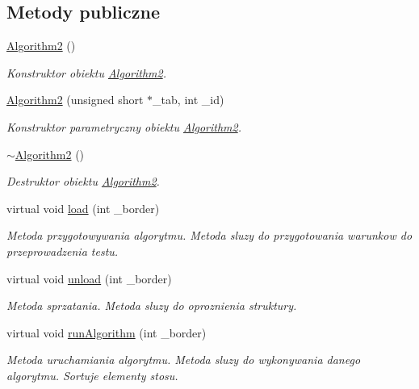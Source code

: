 \subsection*{Metody publiczne}
\begin{DoxyCompactItemize}
\item 
\hyperlink{class_algorithm2_ad77a51433815456eca8139444e78b49b}{Algorithm2} ()
\begin{DoxyCompactList}\small\item\em Konstruktor obiektu \hyperlink{class_algorithm2}{Algorithm2}. \end{DoxyCompactList}\item 
\hyperlink{class_algorithm2_a63a761a11070a07905229137034b3cb9}{Algorithm2} (unsigned short $\ast$\-\_\-tab, int \-\_\-id)
\begin{DoxyCompactList}\small\item\em Konstruktor parametryczny obiektu \hyperlink{class_algorithm2}{Algorithm2}. \end{DoxyCompactList}\item 
\hyperlink{class_algorithm2_ab2c630f56f5d2e90f62a13fdaf0cd954}{$\sim$\-Algorithm2} ()
\begin{DoxyCompactList}\small\item\em Destruktor obiektu \hyperlink{class_algorithm2}{Algorithm2}. \end{DoxyCompactList}\item 
virtual void \hyperlink{class_algorithm2_a50bbb4421660c4200dba66e9da9d7969}{load} (int \-\_\-border)
\begin{DoxyCompactList}\small\item\em Metoda przygotowywania algorytmu. Metoda sluzy do przygotowania warunkow do przeprowadzenia testu. \end{DoxyCompactList}\item 
virtual void \hyperlink{class_algorithm2_a3d7e4d0c9308d0b97250cb5596a73165}{unload} (int \-\_\-border)
\begin{DoxyCompactList}\small\item\em Metoda sprzatania. Metoda sluzy do oproznienia struktury. \end{DoxyCompactList}\item 
virtual void \hyperlink{class_algorithm2_a409e58d5fb0b6d2407cc986cf163703b}{run\-Algorithm} (int \-\_\-border)
\begin{DoxyCompactList}\small\item\em Metoda uruchamiania algorytmu. Metoda sluzy do wykonywania danego algorytmu. Sortuje elementy stosu. \end{DoxyCompactList}\end{DoxyCompactItemize}
